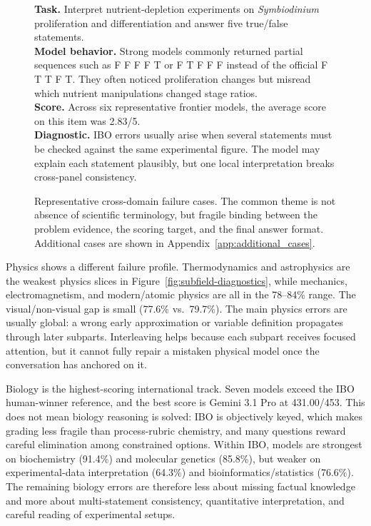 \documentclass[11pt]{article}
\begin{document}
\begin{figure}[t]
\begin{tcolorbox}[
  title={Case C: Biology knowledge is high, but multi-statement data consistency fails (IBO 2023 Item 63)},
  colback=gray!3,
  colframe=black!35,
  boxrule=0.6pt,
  arc=1.5mm,
  left=1.5mm,right=1.5mm,top=1mm,bottom=1mm
]
\footnotesize
\textbf{Task.} Interpret nutrient-depletion experiments on \textit{Symbiodinium} proliferation and differentiation and answer five true/false statements.\\
\textbf{Model behavior.} Strong models commonly returned partial sequences such as F F F F T or F T F F F instead of the official F T T F T. They often noticed proliferation changes but misread which nutrient manipulations changed stage ratios.\\
\textbf{Score.} Across six representative frontier models, the average score on this item was 2.83/5.\\
\textbf{Diagnostic.} IBO errors usually arise when several statements must be checked against the same experimental figure. The model may explain each statement plausibly, but one local interpretation breaks cross-panel consistency.
\end{tcolorbox}
\caption{Representative cross-domain failure cases. The common theme is not absence of scientific terminology, but fragile binding between the problem evidence, the scoring target, and the final answer format. Additional cases are shown in Appendix~\ref{app:additional_cases}.}
\label{fig:structure-failure-cases}
\vspace{-0.3cm}
\end{figure}

Physics shows a different failure profile.
Thermodynamics and astrophysics are the weakest physics slices in Figure~\ref{fig:subfield-diagnostics}, while mechanics, electromagnetism, and modern/atomic physics are all in the 78--84\% range.
The visual/non-visual gap is small (77.6\% vs.\ 79.7\%).
The main physics errors are usually global: a wrong early approximation or variable definition propagates through later subparts.
Interleaving helps because each subpart receives focused attention, but it cannot fully repair a mistaken physical model once the conversation has anchored on it.

Biology is the highest-scoring international track.
Seven models exceed the IBO human-winner reference, and the best score is Gemini 3.1 Pro at 431.00/453.
This does not mean biology reasoning is solved: IBO is objectively keyed, which makes grading less fragile than process-rubric chemistry, and many questions reward careful elimination among constrained options.
Within IBO, models are strongest on biochemistry (91.4\%) and molecular genetics (85.8\%), but weaker on experimental-data interpretation (64.3\%) and bioinformatics/statistics (76.6\%).
The remaining biology errors are therefore less about missing factual knowledge and more about multi-statement consistency, quantitative interpretation, and careful reading of experimental setups.
\end{document}

